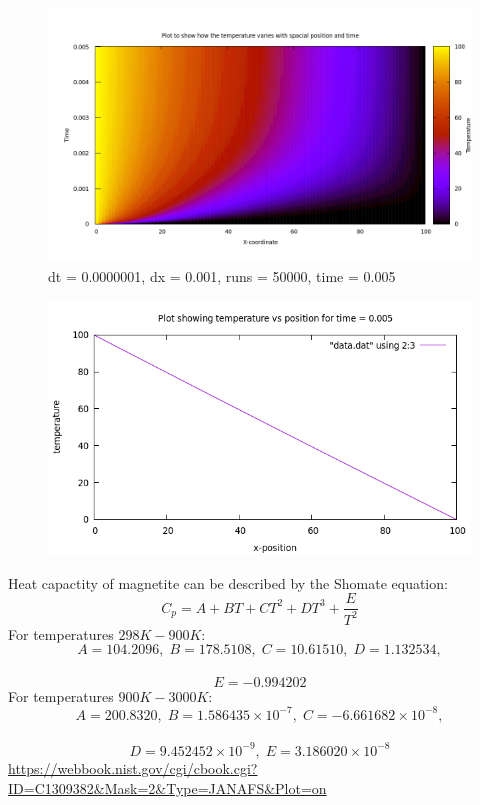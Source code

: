 \documentclass{beamer}
\begin{document}
	\begin{frame}
	\begin{figure}
	\centering
	\includegraphics[scale=0.32]{5.png}
	\caption{dt = 0.0000001, dx = 0.001, runs = 50000, time = 0.005}
\end{figure}
	\end{frame}
	
		
	\begin{frame}
	\begin{figure}
	\centering
	\includegraphics[scale=0.52]{6.png}
\end{figure}
	\end{frame}
	
	\begin{frame}
	Heat capactity of magnetite can be described by the Shomate equation:
	\begin{equation}
    C_p = A + BT + CT^2 + DT^3 + \frac{E}{T^2}
\end{equation}
For temperatures $298K - 900K$:
$$A = 104.2096,\; B = 178.5108,\; C = 10.61510,\; D = 1.132534,$$ \\ $$ E = -0.994202 $$
For temperatures $900K - 3000K$:
$$A = 200.8320,\; B = 1.586435 \times 10^{-7},\; C = -6.661682 \times 10^{-8},$$\\ $$ D = 9.452452 \times 10^{-9},\; E = 3.186020 \times 10^{-8}$$ \url{https://webbook.nist.gov/cgi/cbook.cgi?ID=C1309382&Mask=2&Type=JANAFS&Plot=on}
	\end{frame}
\end{document}

